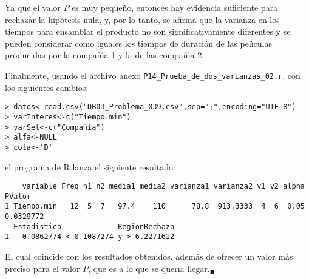 \begin{solucion}
 \begin{conclusion}
  Ya que el valor $P$ es muy peque\~no,
  entonces hay evidencia suficiente para rechazar la hip\'otesis nula,
  y, por lo tanto, se afirma que la varianza en los tiempos
  para ensamblar el producto no son significativamente diferentes
  y se pueden considerar como iguales los tiempos de duraci\'on
  de las pel\'{\i}culas producidas por la compa\~n\'{\i}a 1
  y la de las compa\~n\'{\i}a 2.
 \end{conclusion}

 Finalmente, usando el archivo anexo \texttt{P14\_Prueba\_de\_dos\_varianzas\_02.r}, con los siguientes cambios:
 \begin{verbatim}
> datos<-read.csv("DB03_Problema_039.csv",sep=";",encoding="UTF-8")
> varInteres<-c("Tiempo.min")
> varSel<-c("Compañía")
> alfa<-NULL
> cola<-'D'
 \end{verbatim}
 \vspace{-0.5cm}
 el programa de R lanza el siguiente resultado:
 \begin{verbatim}
    variable Freq n1 n2 media1 media2 varianza1 varianza2 v1 v2 alpha    PValor
1 Tiempo.min   12  5  7   97.4    110      78.8  913.3333  4  6  0.05 0.0329772
  Estadistico             RegionRechazo
1   0.0862774 < 0.1087274 y > 6.2271612
 \end{verbatim}
 \vspace{-0.5cm}
 El cual coincide con los resultados obtenidos,
 adem\'as de ofrecer un valor m\'as preciso para el valor $P$,
 que es a lo que se quer\'{\i}a llegar.${}_{\blacksquare}$
\end{solucion}
